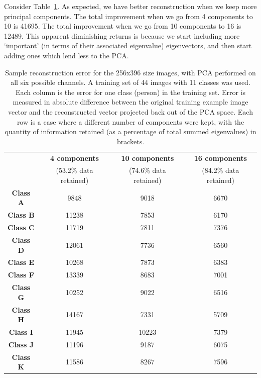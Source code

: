 Consider Table~\ref{tbl:face-rec-2}. As expected, we have better reconstruction when we keep more principal components. The total improvement when we go from 4 components to 10 is 41695. The total improvement when we go from 10 components to 16 is 12489. This apparent diminishing returns is because we start including more `important' (in terms of their associated eigenvalue) eigenvectors, and then start adding ones which lend less to the PCA.

\begin{table}[htpb]
  \centering
  \begin{tabular}{c c c c}
    \toprule
     & \textbf{4 components} & \textbf{10 components} & \textbf{16 components} \\
     & (53.2\% data retained) & (74.6\% data retained) & (84.2\% data retained) \\
    \midrule
    \textbf{Class A} & 9848 & 9018 & 6670\\
    \textbf{Class B} & 11238 & 7853 & 6170\\
    \textbf{Class C} & 11719 & 7811 & 7376\\
    \textbf{Class D} & 12061 & 7736 & 6560\\
    \textbf{Class E} & 10268 & 7873 & 6383\\
    \textbf{Class F} & 13339 & 8683 & 7001\\
    \textbf{Class G} & 10252 & 9022 & 6516\\
    \textbf{Class H} & 14167 & 7331 & 5709\\
    \textbf{Class I} & 11945 & 10223 & 7379\\
    \textbf{Class J} & 11196 & 9187 & 6075\\
    \textbf{Class K} & 11586 & 8267 & 7596\\
    \bottomrule
  \end{tabular}
  \caption[Sample reconstruction error for the 256x396 size images]{Sample reconstruction error for the 256x396 size images, with PCA performed on all six possible channels. A training set of 44 images with 11 classes was used. Each column is the error for one class (person) in the training set. Error is measured in absolute difference between the original training example image vector and the reconstructed vector projected back out of the PCA space. Each row is a case where a different number of components were kept, with the quantity of information retained (as a percentage of total summed eigenvalues) in brackets.}
  \label{tbl:face-rec-2}
\end{table}

